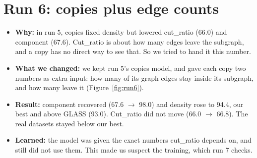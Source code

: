 \documentclass[11pt]{article}
\begin{document}
\section*{Run 6: copies plus edge counts}
\begin{itemize}
  \item \textbf{Why:} in run 5, copies fixed density but lowered cut\_ratio (66.0) and component (67.6). Cut\_ratio is about how many edges leave the subgraph, and a copy has no direct way to see that. So we tried to hand it this number.
  \item \textbf{What we changed:} we kept run 5's copies model, and gave each copy two numbers as extra input: how many of its graph edges stay inside its subgraph, and how many leave it (Figure~\ref{fig:run6}).
  \item \textbf{Result:} component recovered (67.6 $\to$ 98.0) and density rose to 94.4, our best and above GLASS (93.0). Cut\_ratio did not move (66.0 $\to$ 66.8). The real datasets stayed below our best.
  \item \textbf{Learned:} the model was given the exact numbers cut\_ratio depends on, and still did not use them. This made us suspect the training, which run 7 checks.
\end{itemize}
\end{document}
